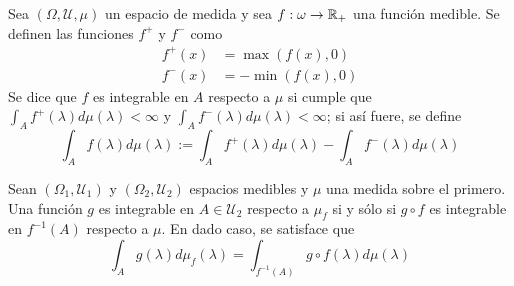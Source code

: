 \begin{definicion}
Sea $(\Omega, \mathcal{U}, \mu)$ un espacio de medida y sea $f:\omega \rightarrow \mathbb{R}_+$ una función medible. Se definen las funciones $f^{+}$ y $f^{-}$ como
\begin{align*}
f^{+}(x) &= \max (f(x), 0 ) \\
f^{-}(x) &= -\min (f(x), 0 )
\end{align*}
Se dice que $f$ es integrable en $A$ respecto a $\mu$ si cumple que $\int_A f^{+}(\lambda) d\mu(\lambda) < \infty$ y $\int_A f^{-}(\lambda) d\mu(\lambda) < \infty$; si así fuere, se define
\begin{equation}
\int_A f(\lambda) d\mu(\lambda) := \int_A f^{+}(\lambda) d\mu(\lambda) - \int_A f^{-}(\lambda) d\mu(\lambda)
\end{equation}
\end{definicion}

\begin{proposicion}
Sean $(\Omega_1,\mathcal{U}_1)$ y $(\Omega_2,\mathcal{U}_2)$ espacios medibles y $\mu$ una medida sobre el primero. Una función $g$ es integrable en $A \in \mathcal{U}_2$ respecto a $\mu_f$ si y sólo si $g \circ f$ es integrable en $f^{-1}(A)$ respecto a $\mu$. En dado caso, se satisface que
\begin{equation}
\int_A g(\lambda) d\mu_f(\lambda) = \int_{f^{-1}(A)} g \circ f (\lambda) d\mu(\lambda)
\end{equation}
\end{proposicion}

%


